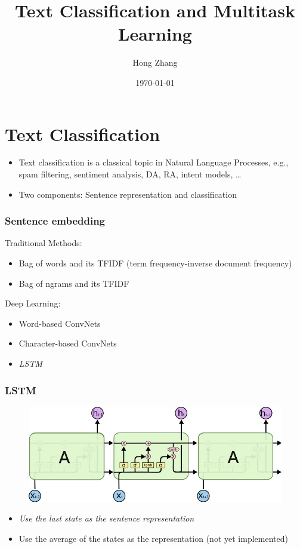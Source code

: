 \documentclass{beamer}
\title[prediction and learning]{Text Classification and Multitask Learning} %
\author{Hong Zhang} %
\institute[Yahoo!] %
{
Yahoo Research \\ %
\medskip
}
\date{\today} %
\begin{document}
\begin{frame}
\titlepage
\end{frame}
\begin{frame}
\tableofcontents
\end{frame}

\section{Text Classification}
\begin{frame}
\begin{itemize}
\item Text classification is a classical topic in Natural Language Processes, e.g., spam filtering,
sentiment analysis,  DA, RA, intent models, \ldots
\item Two components: Sentence representation and classification 
\end{itemize}
\end{frame}



\begin{frame}
\frametitle{Sentence embedding}
Traditional Methods:
\begin{itemize}
\item Bag of words and its TFIDF (term frequency-inverse document frequency)
\item Bag of ngrams and its TFIDF
\end{itemize}
Deep Learning:
\begin{itemize}
\item Word-based ConvNets
\item Character-based ConvNets
\item {\textit{LSTM}} 
\end{itemize}

\end{frame}


\begin{frame}
\frametitle{LSTM}
\begin{figure}
\includegraphics[scale = 0.3]{LSTM.jpg}
\end{figure}
\begin{itemize}
\item \textit{Use the last state as the sentence representation} 
\item Use the average of the states as the representation (not yet implemented)
\end{itemize}

\end{frame}
\end{document}
